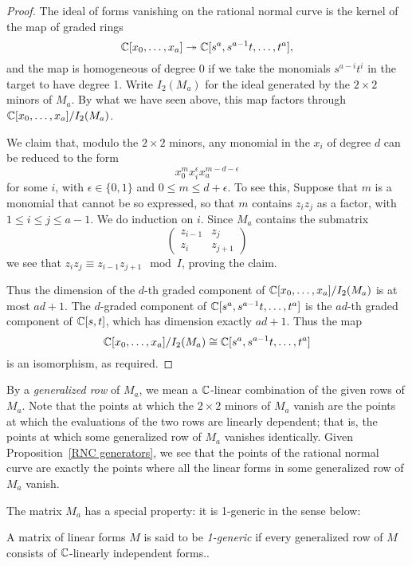 \begin{proof}
The ideal of forms vanishing on the rational normal curve is the kernel of the map of graded rings
$$
\CC[x_{0},\dots, x_{a}] \twoheadrightarrow \CC[s^{a}, s^{a-1}t, \dots,t^{a}],
$$
and the map is homogeneous of degree 0 if we take the monomials $s^{a-i}t^{i}$ in the target to have 
degree 1. Write $I_{2}(M_{a})$ for the ideal generated by the $2\times 2$ minors of $M_{a}$. By what we have seen above, this map factors through 
$\CC[x_{0},\dots, x_{a}]/I_{2}(M_{a})$.

We claim that,
modulo the $2\times 2$ minors, any monomial in the $x_{i}$ of degree $d$ can be reduced to the form 
$$
x_{0}^{m} x_{i}^{\epsilon} x_{a}^{m-d-\epsilon}
$$
for some $i$, with $\epsilon\in \{0,1\}$ and $0\leq m\leq d+\epsilon$. To see this,
Suppose that $m$ is a monomial that cannot be so expressed, so that $m$ contains $z_iz_j$ as a factor, with $1\leq i\leq j\leq a-1$. We do induction on $i$. Since
$M_a$ contains the submatrix
$$
\begin{pmatrix}
 z_{i-1} & z_{j}\\
 z_i & z_{j+1}
\end{pmatrix}
$$
we see that $z_iz_j \equiv z_{i-1}z_{j+1}\mod I$, proving the claim.

Thus the dimension of the $d$-th graded
component of $\CC[x_{0},\dots, x_{a}]/I_{2}(M_{a})$ is at most $ad+1$. The
$d$-graded component of $\CC[s^{a}, s^{a-1}t, \dots,t^{a}]$ is the $ad$-th graded component of
$\CC[s,t]$, which has dimension exactly $ad+1$. Thus the  map 
$$
\CC[x_{0},\dots, x_{a}]/I_{2}(M_{a})\cong \CC[s^{a}, s^{a-1}t, \dots,t^{a}]
$$ 
is an isomorphism, as required.
\end{proof}

By a \emph{generalized row} of $M_{a}$, we mean a $\CC$-linear combination of the given rows of $M_{a}$. Note that the points at which the $2\times 2$ minors of $M_{a}$ vanish are the points at which the evaluations of the two rows are linearly dependent; that is, the points at which some
generalized row of $M_{a}$ vanishes identically. Given Proposition~\ref{RNC generators}, we see that the points of the rational normal curve are exactly the points where all the linear forms in some generalized row
of $M_{a}$ vanish.

The matrix $M_{a}$ has a special property: it is 1-generic in the sense below:

\begin{definition}
 A matrix of linear forms $M$ is said to be \emph{1-generic} if every generalized row of $M$
 consists of $\CC$-linearly independent forms.. 
 \end{definition}

